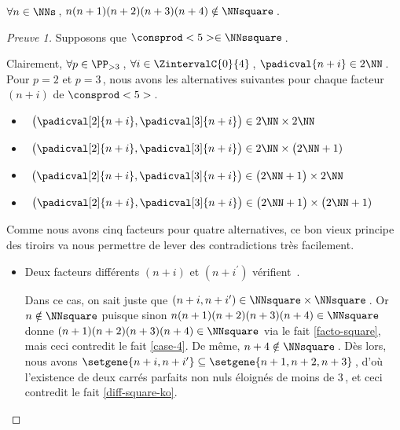 \begin{fact} \label{case-5}
	 $\forall n \in \NNs$\,, $n(n+1)(n+2)(n+3)(n+4) \notin \NNsquare$\,.
\end{fact}




\begin{proof}[Preuve 1]%
    Supposons que $\consprod<5> \in \NNssquare$\,.
    
    \smallskip
    
    Clairement, 
    $\forall p \in \PP_{>3}$\,, 
    $\forall i \in \ZintervalC{0}{4}$\,, 
    $\padicval{n + i} \in 2 \NN$\,.
    Pour $p = 2$ et $p = 3$\,, nous avons les alternatives suivantes pour chaque facteur $(n+i)$ de $\consprod<5>$\,.
    \begin{itemize}
    	\smallskip
		\item {}\,
		$\big( \padicval[2]{n + i} , \padicval[3]{n + i} \big) \in 2 \NN \times 2 \NN$

    	\smallskip
		\item {}\,
		$\big( \padicval[2]{n + i} , \padicval[3]{n + i} \big) \in 2 \NN \times \big( 2 \NN + 1)$

    	\smallskip
		\item {}\,
		$\big( \padicval[2]{n + i} , \padicval[3]{n + i} \big) \in \big( 2 \NN + 1 \big) \times 2 \NN$

    	\smallskip
		\item {}\,
		$\big( \padicval[2]{n + i} , \padicval[3]{n + i} \big) \in \big( 2 \NN + 1 \big) \times \big( 2 \NN + 1)$
    \end{itemize}
    
    \medskip
    
    Comme nous avons cinq facteurs pour quatre alternatives, ce bon vieux principe des tiroirs va nous permettre de lever des contradictions très facilement.
    \begin{itemize}
    	\medskip
		\item Deux facteurs différents $(n+i)$ et $(n+i^\prime)$ vérifient \,.
		
		\smallskip
		\noindent
		Dans ce cas, on sait juste que $(n+i, n+i^\prime) \in \NNsquare \times \NNsquare$\,.
		Or $n \notin \NNsquare$ puisque sinon $n(n+1)(n+2)(n+3)(n+4) \in \NNsquare$ donne $(n+1)(n+2)(n+3)(n+4) \in \NNsquare$ via le fait \ref{facto-square}, mais ceci contredit le fait \ref{case-4}.
		De même, $n+4 \notin \NNsquare$\,.
		Dès lors, nous avons $\setgene{n+i, n+i^\prime} \subseteq \setgene{n+1, n+2, n+3}$\,, d'où l'existence de deux carrés parfaits non nuls éloignés de moins de $3$\,, et ceci contredit le fait \ref{diff-square-ko}.



\end{itemize}
\end{proof}
